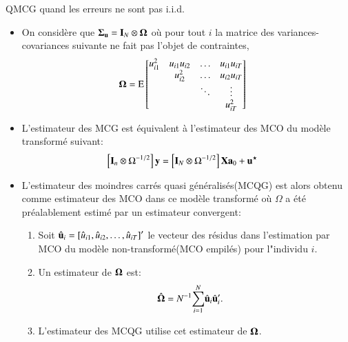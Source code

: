 \begin{frame}[allowframebreaks]{QMCG quand les erreurs ne sont pas i.i.d.}
    \begin{itemize}
        \item On considère que ${\boldsymbol \Sigma}_{{\mathbf u}} = \mathbf{I}_N\otimes{\boldsymbol \Omega}$ où pour tout $i$ la matrice des variances-covariances 
        suivante ne fait pas l'objet de contraintes,
        \begin{align*}
        {\boldsymbol \Omega} &= 
        \operatorname{E}
        \begin{bmatrix}
        u_{i1}^2&u_{i1} u_{i2}&\ldots &u_{i1}u_{iT}\\
        &u_{i2}^2&\ldots&u_{i2}u_{iT}\\
        &&\ddots&\vdots\\
        &&&u_{iT}^2
        \end{bmatrix}
        \end{align*}
        \item L'estimateur des MCG est équivalent à l'estimateur des MCO du modèle transformé suivant:
        \begin{align*}
        \left[\mathbf{I}_n \otimes \Omega^{-1/2}\right]{\mathbf y} &= \left[\mathbf{I}_N \otimes \Omega^{-1/2}\right]\mathbf X{\mathbf a}_0 + {\mathbf u}^{\star}
        \end{align*}
        \item L'estimateur des moindres carrés quasi généralisés(MCQG) est alors obtenu comme estimateur des MCO dans 
        ce modèle transformé où $ \Omega$ a été préalablement estimé par un estimateur convergent:
        \begin{enumerate}[$\star$]
        \item Soit $\hat{{\mathbf u}}_i= \left[\hat{u}_{i1},  \hat{u}_{i2}, \ldots,\hat{u}_{iT}\right]^\prime$ 
        le vecteur des résidus dans l'estimation par MCO du modèle non-transformé(MCO empilés) 
        pour l"individu $i$.  
        \item Un estimateur de ${\boldsymbol \Omega}$ est:
        \begin{align*}
        \hat{{\boldsymbol \Omega}} &= N^{-1} {\sum_{i=1}^N} \hat{{\mathbf u}}_i\hat{{\mathbf u}}_i^\prime.
        \end{align*}
        \item L'estimateur des MCQG utilise cet estimateur de ${\boldsymbol \Omega}$.
    \end{enumerate}
    \end{itemize}
\end{frame}

